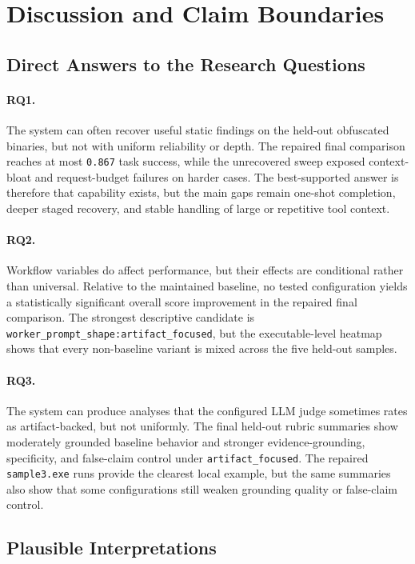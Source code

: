 \section{Discussion and Claim Boundaries}

\subsection{Direct Answers to the Research Questions}

\paragraph{RQ1.} The system can often recover useful static findings on the held-out obfuscated binaries, but not with uniform reliability or depth. The repaired final comparison reaches at most \texttt{0.867} task success, while the unrecovered sweep exposed context-bloat and request-budget failures on harder cases. The best-supported answer is therefore that capability exists, but the main gaps remain one-shot completion, deeper staged recovery, and stable handling of large or repetitive tool context.

\paragraph{RQ2.} Workflow variables do affect performance, but their effects are conditional rather than universal. Relative to the maintained baseline, no tested configuration yields a statistically significant overall score improvement in the repaired final comparison. The strongest descriptive candidate is \texttt{worker\_prompt\_shape:artifact\_focused}, but the executable-level heatmap shows that every non-baseline variant is mixed across the five held-out samples.

\paragraph{RQ3.} The system can produce analyses that the configured LLM judge sometimes rates as artifact-backed, but not uniformly. The final held-out rubric summaries show moderately grounded baseline behavior and stronger evidence-grounding, specificity, and false-claim control under \texttt{artifact\_focused}. The repaired \texttt{sample3.exe} runs provide the clearest local example, but the same summaries also show that some configurations still weaken grounding quality or false-claim control.

\subsection{Plausible Interpretations}

